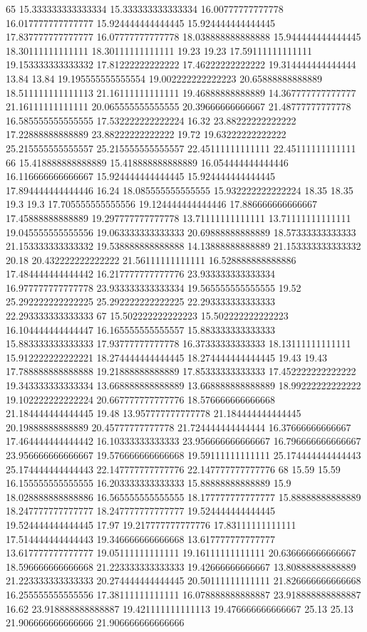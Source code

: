 65 15.333333333333334 15.333333333333334 16.00777777777778 16.017777777777777 15.924444444444445 15.924444444444445 17.837777777777777 16.07777777777778 18.038888888888888 15.944444444444445 18.30111111111111 18.30111111111111 19.23 19.23 17.59111111111111 19.153333333333332 17.81222222222222 17.46222222222222 19.314444444444444 13.84 13.84 19.195555555555554 19.002222222222223 20.65888888888889 18.511111111111113 21.16111111111111 19.46888888888889 14.367777777777777 21.16111111111111 20.065555555555555 20.39666666666667 21.48777777777778 16.585555555555555 17.532222222222224 16.32 23.88222222222222 17.22888888888889 23.88222222222222 19.72 19.63222222222222 25.215555555555557 25.215555555555557 22.45111111111111 22.45111111111111
66 15.418888888888889 15.418888888888889 16.054444444444446 16.116666666666667 15.924444444444445 15.924444444444445 17.894444444444446 16.24 18.085555555555555 15.932222222222224 18.35 18.35 19.3 19.3 17.705555555555556 19.124444444444446 17.886666666666667 17.45888888888889 19.297777777777778 13.71111111111111 13.71111111111111 19.045555555555556 19.063333333333333 20.69888888888889 18.57333333333333 21.153333333333332 19.538888888888888 14.13888888888889 21.153333333333332 20.18 20.432222222222222 21.56111111111111 16.528888888888886 17.484444444444442 16.217777777777776 23.933333333333334 16.977777777777778 23.933333333333334 19.565555555555555 19.52 25.292222222222225 25.292222222222225 22.293333333333333 22.293333333333333
67 15.502222222222223 15.502222222222223 16.104444444444447 16.165555555555557 15.883333333333333 15.883333333333333 17.93777777777778 16.37333333333333 18.13111111111111 15.912222222222221 18.274444444444445 18.274444444444445 19.43 19.43 17.788888888888888 19.21888888888889 17.85333333333333 17.452222222222222 19.343333333333334 13.668888888888889 13.668888888888889 18.99222222222222 19.102222222222224 20.667777777777776 18.576666666666668 21.184444444444445 19.48 13.957777777777778 21.184444444444445 20.19888888888889 20.45777777777778 21.724444444444444 16.37666666666667 17.464444444444442 16.10333333333333 23.956666666666667 16.796666666666667 23.956666666666667 19.576666666666668 19.59111111111111 25.174444444444443 25.174444444444443 22.147777777777776 22.147777777777776
68 15.59 15.59 16.155555555555555 16.203333333333333 15.88888888888889 15.9 18.028888888888886 16.565555555555555 18.177777777777777 15.88888888888889 18.247777777777777 18.247777777777777 19.524444444444445 19.524444444444445 17.97 19.217777777777776 17.83111111111111 17.514444444444443 19.346666666666668 13.617777777777777 13.617777777777777 19.05111111111111 19.16111111111111 20.636666666666667 18.596666666666668 21.223333333333333 19.42666666666667 13.80888888888889 21.223333333333333 20.274444444444445 20.50111111111111 21.826666666666668 16.255555555555556 17.38111111111111 16.078888888888887 23.918888888888887 16.62 23.918888888888887 19.421111111111113 19.476666666666667 25.13 25.13 21.906666666666666 21.906666666666666
